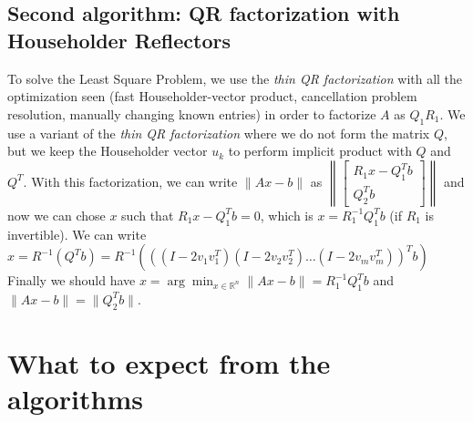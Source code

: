 \documentclass{article}
\begin{document}
\subsection{Second algorithm: QR factorization with Householder Reflectors}\label{subsec:qr-factorization-with-householder-reflectors}
To solve the Least Square Problem, we use the \textit{thin QR factorization} with all the optimization seen (fast Householder-vector product, cancellation problem resolution, manually changing known entries) in order to factorize $A$ as $Q_{1}R_{1}$.
We use a variant \cite{nla} of the \textit{thin QR factorization} where we do not form the matrix $Q$, but we keep the Householder vector $u_{k}$ to perform implicit product with $Q$ and $Q^{T}$.
With this factorization, we can write $\|Ax - b\|$ as $\left\lVert \begin{bmatrix} R_{1}x - Q_{1}^{T}b \\ Q_{2}^{T}b\end{bmatrix} \right\lVert$
and now we can chose $x$ such that $R_{1}x - Q_{1}^{T}b = 0$, which is $x = R_{1}^{-1}Q_{1}^{T}b$ (if $R_{1}$ is invertible).
We can write $x = R^{-1}(Q^{T}b) = R^{-1}(((I-2v_{1}v_{1}^{T})(I-2v_{2}v_{2}^{T})\dots(I-2v_{m}v_{m}^{T}))^{T}b)$
Finally we should have $x  = \arg\!\min_{x \in  \mathds{R}^n}\|Ax - b\| = R_{1}^{-1}Q_{1}^{T}b$ and $\|Ax - b\| = \|Q_{2}^{T}b\|$.

\section{What to expect from the algorithms}\label{sec:what-to-expect-from-the-algorithms}
\end{document}
